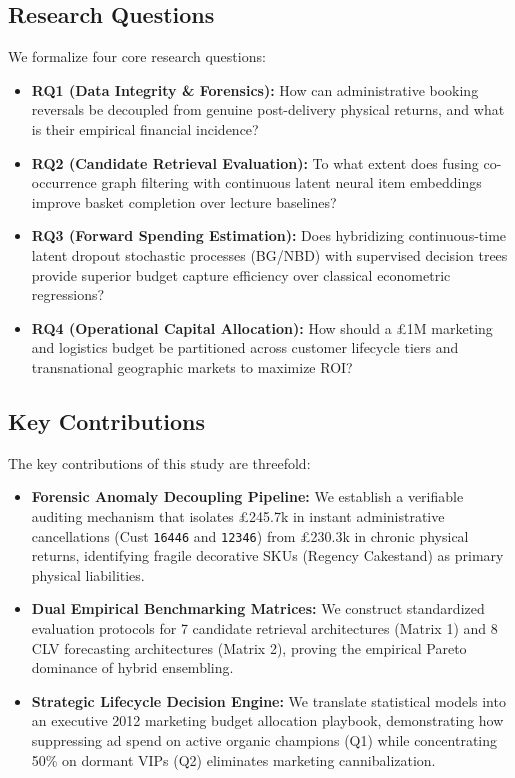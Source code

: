 \documentclass[sigconf,nonacm]{acmart}
\begin{document}
\subsection{Research Questions}
We formalize four core research questions:
\begin{itemize}
    \item \textbf{RQ1 (Data Integrity \& Forensics):} How can administrative booking reversals be decoupled from genuine post-delivery physical returns, and what is their empirical financial incidence?
    \item \textbf{RQ2 (Candidate Retrieval Evaluation):} To what extent does fusing co-occurrence graph filtering with continuous latent neural item embeddings improve basket completion over lecture baselines?
    \item \textbf{RQ3 (Forward Spending Estimation):} Does hybridizing continuous-time latent dropout stochastic processes (BG/NBD) with supervised decision trees provide superior budget capture efficiency over classical econometric regressions?
    \item \textbf{RQ4 (Operational Capital Allocation):} How should a £1M marketing and logistics budget be partitioned across customer lifecycle tiers and transnational geographic markets to maximize ROI?
\end{itemize}

\subsection{Key Contributions}
The key contributions of this study are threefold:
\begin{itemize}
    \item \textbf{Forensic Anomaly Decoupling Pipeline:} We establish a verifiable auditing mechanism that isolates £245.7k in instant administrative cancellations (Cust \texttt{16446} and \texttt{12346}) from £230.3k in chronic physical returns, identifying fragile decorative SKUs (Regency Cakestand) as primary physical liabilities.
    \item \textbf{Dual Empirical Benchmarking Matrices:} We construct standardized evaluation protocols for 7 candidate retrieval architectures (Matrix 1) and 8 CLV forecasting architectures (Matrix 2), proving the empirical Pareto dominance of hybrid ensembling.
    \item \textbf{Strategic Lifecycle Decision Engine:} We translate statistical models into an executive 2012 marketing budget allocation playbook, demonstrating how suppressing ad spend on active organic champions (Q1) while concentrating 50\% on dormant VIPs (Q2) eliminates marketing cannibalization.
\end{itemize}
\end{document}
